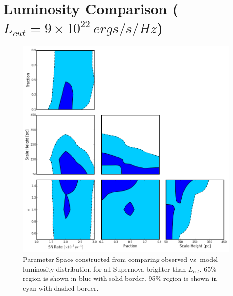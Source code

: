 \documentclass[10pt,a4paper]{article}
\begin{document}
\section* {Luminosity Comparison ($L_{cut} = 9 \times 10^{22}\ ergs/s/Hz$)}
\begin{figure}[h!]
\includegraphics[width=15cm]{TrianglePlot_lums2.png}
\caption{Parameter Space constructed from comparing observed vs. model luminosity distribution for all Supernova brighter than $L_{cut}$. 65$\%$ region is shown in blue with solid border. 95$\%$ region is shown in cyan with dashed border.}
\end{figure}
\newpage
\end{document}

